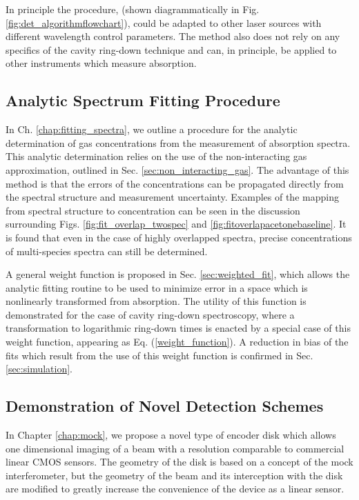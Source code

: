 \documentclass[12pt]{report}
\begin{document}
	In principle the procedure, (shown diagrammatically in Fig. \ref{fig:det_algorithmflowchart}), could be adapted to other laser sources with different wavelength control parameters. The method also does not rely on any specifics of the cavity ring-down technique and can, in principle, be applied to other instruments which measure absorption.
	
	\subsection{Analytic Spectrum Fitting Procedure}
	In Ch. \ref{chap:fitting_spectra}, we outline a procedure for the analytic determination of gas concentrations from the measurement of absorption spectra. This analytic determination relies on the use of the non-interacting gas approximation, outlined in Sec. \ref{sec:non_interacting_gas}. The advantage of this method is that the errors of the concentrations can be propagated directly from the spectral structure and measurement uncertainty. Examples of the mapping from spectral structure to concentration can be seen in the discussion surrounding Figs. \ref{fig:fit_overlap_twospec} and \ref{fig:fitoverlapacetonebaseline}. It is found that even in the case of highly overlapped spectra, precise concentrations of multi-species spectra can still be determined.
	
	A general weight function is proposed in Sec. \ref{sec:weighted_fit}, which allows the analytic fitting routine to be used to minimize error in a space which is nonlinearly transformed from absorption. The utility of this function is demonstrated for the case of cavity ring-down spectroscopy, where a transformation to logarithmic ring-down times is enacted by a special case of this weight function, appearing as Eq. (\ref{weight_function}). A reduction in bias of the fits which result from the use of this weight function is confirmed in Sec. \ref{sec:simulation}.
	
	\subsection{Demonstration of Novel Detection Schemes}
	In Chapter \ref{chap:mock}, we propose a novel type of encoder disk which allows one dimensional imaging of a beam with a resolution comparable to commercial linear CMOS sensors. The geometry of the disk is based on a concept of the mock interferometer, but the geometry of the beam and its interception with the disk are modified to greatly increase the convenience of the device as a linear sensor.
	
\end{document}
